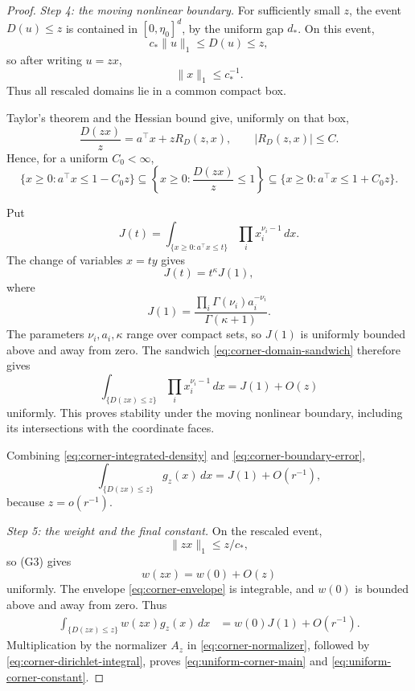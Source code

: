 \begin{proof}
\medskip
\noindent
\emph{Step 4: the moving nonlinear boundary.}
For sufficiently small \(z\), the event \(D(u)\le z\) is
contained in \([0,\eta_0]^d\), by the uniform gap \(d_*\).
On this event,
\[
 c_*\|u\|_1\le D(u)\le z,
\]
so after writing \(u=zx\),
\[
 \|x\|_1\le c_*^{-1}.
\]
Thus all rescaled domains lie in a common compact box.

Taylor's theorem and the Hessian bound give, uniformly on that
box,
\begin{equation}
 \frac{D(zx)}{z}
 =
 a^\top x+zR_D(z,x),
 \qquad
 |R_D(z,x)|\le C.
 \label{eq:corner-D-Taylor}
\end{equation}
Hence, for a uniform \(C_0<\infty\),
\begin{equation}
 \{x\ge0:a^\top x\le1-C_0z\}
 \subseteq
 \left\{x\ge0:\frac{D(zx)}z\le1\right\}
 \subseteq
 \{x\ge0:a^\top x\le1+C_0z\}.
 \label{eq:corner-domain-sandwich}
\end{equation}

Put
\[
 J(t)
 =
 \int_{\{x\ge0:a^\top x\le t\}}
 \prod_ix_i^{\nu_i-1}\,dx.
\]
The change of variables \(x=ty\) gives
\[
 J(t)=t^\kappa J(1),
\]
where
\begin{equation}
 J(1)
 =
 \frac{\prod_i\Gamma(\nu_i)a_i^{-\nu_i}}
      {\Gamma(\kappa+1)}.
 \label{eq:corner-dirichlet-integral}
\end{equation}
The parameters \(\nu_i,a_i,\kappa\) range over compact sets, so
\(J(1)\) is uniformly bounded above and away from zero.
The sandwich \eqref{eq:corner-domain-sandwich} therefore gives
\begin{equation}
 \int_{\{D(zx)\le z\}}\prod_ix_i^{\nu_i-1}\,dx
 =
 J(1)+O(z)
 \label{eq:corner-boundary-error}
\end{equation}
uniformly. This proves stability under the moving nonlinear
boundary, including its intersections with the coordinate
faces.

Combining \eqref{eq:corner-integrated-density} and
\eqref{eq:corner-boundary-error},
\begin{equation}
 \int_{\{D(zx)\le z\}}g_z(x)\,dx
 =
 J(1)+O(r^{-1}),
 \label{eq:corner-unweighted-integral}
\end{equation}
because \(z=o(r^{-1})\).

\medskip
\noindent
\emph{Step 5: the weight and the final constant.}
On the rescaled event,
\[
 \|zx\|_1\le z/c_*,
\]
so (G3) gives
\[
 w(zx)=w(0)+O(z)
\]
uniformly. The envelope \eqref{eq:corner-envelope} is
integrable, and \(w(0)\) is bounded above and away from zero.
Thus
\begin{align}
 \int_{\{D(zx)\le z\}}w(zx)g_z(x)\,dx
 &=
 w(0)J(1)+O(r^{-1}).
 \label{eq:corner-weighted-integral}
\end{align}
Multiplication by the normalizer \(A_z\) in
\eqref{eq:corner-normalizer}, followed by
\eqref{eq:corner-dirichlet-integral}, proves
\eqref{eq:uniform-corner-main} and
\eqref{eq:uniform-corner-constant}.


\end{proof}
